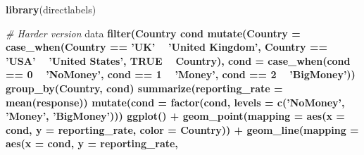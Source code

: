 \documentclass[12pt,halfline,a4paper,]{ouparticle}
\newenvironment{Shaded}{\begin{snugshade}}{\end{snugshade}}
\newcommand{\CommentTok}[1]{\textcolor[rgb]{0.56,0.35,0.01}{\textit{#1}}}
\newcommand{\DataTypeTok}[1]{\textcolor[rgb]{0.13,0.29,0.53}{#1}}
\newcommand{\DecValTok}[1]{\textcolor[rgb]{0.00,0.00,0.81}{#1}}
\newcommand{\KeywordTok}[1]{\textcolor[rgb]{0.13,0.29,0.53}{\textbf{#1}}}
\newcommand{\NormalTok}[1]{#1}
\newcommand{\OperatorTok}[1]{\textcolor[rgb]{0.81,0.36,0.00}{\textbf{#1}}}
\newcommand{\OtherTok}[1]{\textcolor[rgb]{0.56,0.35,0.01}{#1}}
\newcommand{\StringTok}[1]{\textcolor[rgb]{0.31,0.60,0.02}{#1}}
\begin{document}
\begin{Shaded}
\begin{Highlighting}[]
\KeywordTok{library}\NormalTok{(directlabels)}

\CommentTok{# Harder version}
\NormalTok{data }\OperatorTok{%
\StringTok{  }\KeywordTok{filter}\NormalTok{(Country }\OperatorTok{%
\NormalTok{         cond }\OperatorTok{%
\StringTok{  }\KeywordTok{mutate}\NormalTok{(}\DataTypeTok{Country =} \KeywordTok{case_when}\NormalTok{(Country }\OperatorTok{==}\StringTok{ 'UK'} \OperatorTok{~}\StringTok{ 'United Kingdom'}\NormalTok{,}
\NormalTok{                             Country }\OperatorTok{==}\StringTok{ 'USA'} \OperatorTok{~}\StringTok{ 'United States'}\NormalTok{,}
                             \OtherTok{TRUE} \OperatorTok{~}\StringTok{ }\NormalTok{Country),}
         \DataTypeTok{cond =} \KeywordTok{case_when}\NormalTok{(cond }\OperatorTok{==}\StringTok{ }\DecValTok{0} \OperatorTok{~}\StringTok{ 'NoMoney'}\NormalTok{,}
\NormalTok{                          cond }\OperatorTok{==}\StringTok{ }\DecValTok{1} \OperatorTok{~}\StringTok{ 'Money'}\NormalTok{,}
\NormalTok{                          cond }\OperatorTok{==}\StringTok{ }\DecValTok{2} \OperatorTok{~}\StringTok{ 'BigMoney'}\NormalTok{)) }\OperatorTok{%
\StringTok{  }\KeywordTok{group_by}\NormalTok{(Country, cond) }\OperatorTok{%
\StringTok{  }\KeywordTok{summarize}\NormalTok{(}\DataTypeTok{reporting_rate =} \KeywordTok{mean}\NormalTok{(response)) }\OperatorTok{%
\StringTok{  }\KeywordTok{mutate}\NormalTok{(}\DataTypeTok{cond =} \KeywordTok{factor}\NormalTok{(cond, }\DataTypeTok{levels =} \KeywordTok{c}\NormalTok{(}\StringTok{'NoMoney'}\NormalTok{, }\StringTok{'Money'}\NormalTok{, }\StringTok{'BigMoney'}\NormalTok{))) }\OperatorTok{%
\StringTok{  }\KeywordTok{ggplot}\NormalTok{() }\OperatorTok{+}\StringTok{ }
\StringTok{  }\KeywordTok{geom_point}\NormalTok{(}\DataTypeTok{mapping =} \KeywordTok{aes}\NormalTok{(}\DataTypeTok{x =}\NormalTok{ cond, }\DataTypeTok{y =}\NormalTok{ reporting_rate,}
                           \DataTypeTok{color =}\NormalTok{ Country)) }\OperatorTok{+}\StringTok{ }
\StringTok{  }\KeywordTok{geom_line}\NormalTok{(}\DataTypeTok{mapping =} \KeywordTok{aes}\NormalTok{(}\DataTypeTok{x =}\NormalTok{ cond, }\DataTypeTok{y =}\NormalTok{ reporting_rate,}
}}}}}}}
\end{Highlighting}
\end{Shaded}
\end{document}
